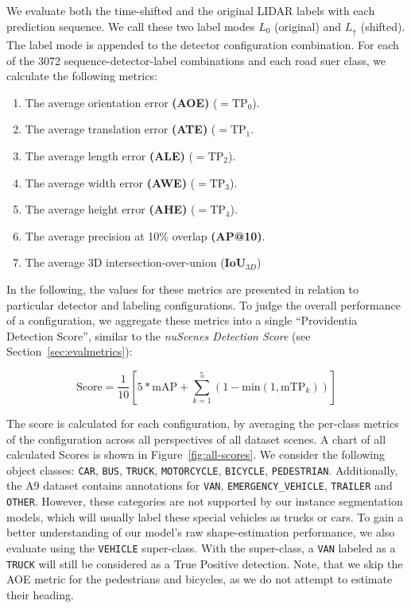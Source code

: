 We evaluate both the time-shifted and the original LIDAR labels with each prediction sequence.
We call these two label modes $L_0$ (original) and $L_{\uparrow}$ (shifted).
The label mode is appended to the detector configuration combination.
For each of the 3072 sequence-detector-label combinations and each road suer class, we calculate the following metrics:

\begin{enumerate}
    \item The average orientation error \textbf{(AOE)} ($=\text{TP}_0$).
    \item The average translation error \textbf{(ATE)} ($=\text{TP}_1$.
    \item The average length error \textbf{(ALE)} ($=\text{TP}_2$).
    \item The average width error \textbf{(AWE)} ($=\text{TP}_3$).
    \item The average height error \textbf{(AHE)} ($=\text{TP}_4$).
    \item The average precision at 10\% overlap \textbf{(AP@10)}.
    \item The average 3D intersection-over-union ($\mathbf{IoU}_{3D}$)
\end{enumerate}

In the following, the values for these metrics are presented in relation to particular detector and labeling configurations.
To judge the overall performance of a configuration, we aggregate these metrics into a single \enquote{Providentia Detection Score}, similar to the \textit{nuScenes Detection Score} (see Section~\ref{sec:evalmetrics}):

\[
    \text{Score} = \frac{1}{10} \left[5 * \text{mAP} + \sum^5_{k=1}(1-\text{min}(1, \text{mTP}_k))\right]
\]

The score is calculated for each configuration, by averaging the per-class metrics of the configuration across all perspectives of all dataset scenes.
A chart of all calculated Scores is shown in Figure~\ref{fig:all-scores}.
We consider the following object classes: \texttt{CAR}, \texttt{BUS}, \texttt{TRUCK}, \texttt{MOTORCYCLE}, \texttt{BICYCLE}, \texttt{PEDESTRIAN}.
Additionally, the A9 dataset contains annotations for \texttt{VAN}, \texttt{EMERGENCY\_VEHICLE}, \texttt{TRAILER} and \texttt{OTHER}.
However, these categories are not supported by our instance segmentation models, which will usually label these special vehicles as trucks or cars.
To gain a better understanding of our model's raw shape-estimation performance, we also evaluate using the \texttt{VEHICLE} super-class.
With the super-class, a \texttt{VAN} labeled as a \texttt{TRUCK} will still be considered as a True Positive detection.
Note, that we skip the AOE metric for the pedestrians and bicycles, as we do not attempt to estimate their heading.


